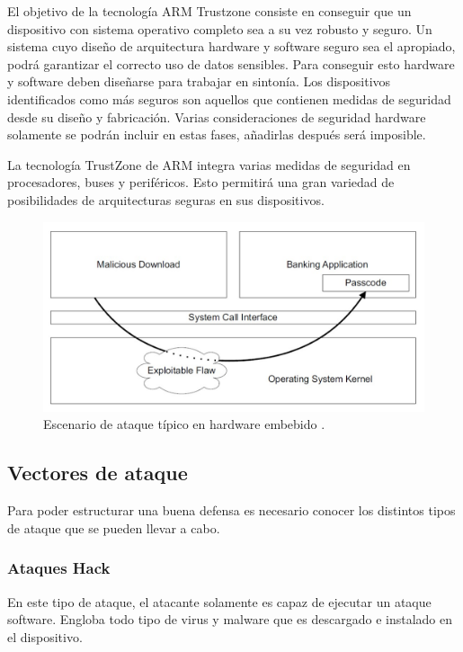 El objetivo de la tecnología ARM Trustzone consiste en conseguir que un dispositivo con sistema operativo completo sea a su vez robusto y seguro. Un sistema cuyo diseño de arquitectura hardware y software seguro sea el apropiado, podrá garantizar el correcto uso de datos sensibles. Para conseguir esto hardware y software deben diseñarse para trabajar en sintonía. Los dispositivos identificados como más seguros son aquellos que contienen medidas de seguridad desde su diseño y fabricación. Varias consideraciones de seguridad hardware solamente se podrán incluir en estas fases, añadirlas después será imposible. \newline

La tecnología TrustZone de ARM integra varias medidas de seguridad en procesadores, buses y periféricos. Esto permitirá una gran variedad de posibilidades de arquitecturas seguras en sus dispositivos.


\begin{figure}
	\centering
	\includegraphics[width=1\textwidth]{imagenes/ataque.jpg}
	\caption{\label{fig1}Escenario de ataque típico en hardware embebido \cite{trustzone}.}
\end{figure}

\subsection{Vectores de ataque}
Para poder estructurar una buena defensa es necesario conocer los distintos tipos de ataque que se pueden llevar a cabo.

\subsubsection{Ataques Hack}
En este tipo de ataque, el atacante solamente es capaz de ejecutar un ataque software. Engloba todo tipo de virus y malware que es descargado e instalado en el dispositivo.

